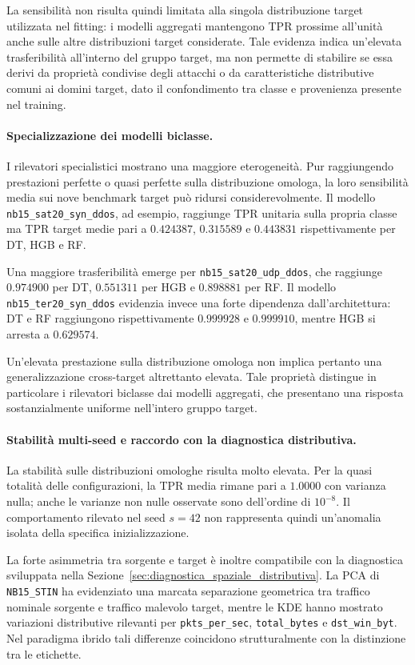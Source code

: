 La sensibilità non risulta quindi limitata alla singola distribuzione target utilizzata nel fitting: i modelli aggregati mantengono TPR prossime all'unità anche sulle altre distribuzioni target considerate. 
Tale evidenza indica un'elevata trasferibilità all'interno del gruppo target, ma non permette di stabilire se essa derivi da proprietà condivise degli attacchi o da caratteristiche distributive comuni ai domini target, dato il confondimento tra classe e provenienza presente nel training.

\paragraph{Specializzazione dei modelli biclasse.} I rilevatori specialistici mostrano una maggiore eterogeneità. 
Pur raggiungendo prestazioni perfette o quasi perfette sulla distribuzione omologa, la loro sensibilità media sui nove benchmark target può ridursi considerevolmente. 
Il modello \texttt{nb15\_sat20\_syn\_ddos}, ad esempio, raggiunge TPR unitaria sulla propria classe ma TPR target medie pari a $0.424387$, $0.315589$ e $0.443831$ rispettivamente per DT, HGB e RF.

Una maggiore trasferibilità emerge per \texttt{nb15\_sat20\_udp\_ddos}, che raggiunge $0.974900$ per DT, $0.551311$ per HGB e $0.898881$ per RF. 
Il modello \texttt{nb15\_ter20\_syn\_ddos} evidenzia invece una forte dipendenza dall'architettura: DT e RF raggiungono rispettivamente $0.999928$ e $0.999910$, mentre HGB si arresta a $0.629574$.

Un'elevata prestazione sulla distribuzione omologa non implica pertanto una generalizzazione cross-target altrettanto elevata. 
Tale proprietà distingue in particolare i rilevatori biclasse dai modelli aggregati, che presentano una risposta sostanzialmente uniforme nell'intero gruppo target.

\paragraph{Stabilità multi-seed e raccordo con la diagnostica distributiva.}
La stabilità sulle distribuzioni omologhe risulta molto elevata.  Per la quasi totalità delle configurazioni, la TPR media rimane pari a $1.0000$ con varianza nulla; anche le varianze non nulle osservate sono dell'ordine di $10^{-8}$. 
Il comportamento rilevato nel seed $s=42$ non rappresenta quindi un'anomalia isolata della specifica inizializzazione.

La forte asimmetria tra sorgente e target è inoltre compatibile con la diagnostica sviluppata nella Sezione~\ref{sec:diagnostica_spaziale_distributiva}. 
La PCA di \texttt{NB15\_STIN} ha evidenziato una marcata separazione geometrica tra traffico nominale sorgente e traffico malevolo target, mentre le KDE hanno
mostrato variazioni distributive rilevanti per \texttt{pkts\_per\_sec}, \texttt{total\_bytes} e \texttt{dst\_win\_byt}. 
Nel paradigma ibrido tali differenze coincidono strutturalmente con la distinzione tra le etichette.

